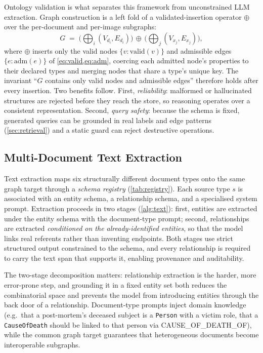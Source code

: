 \documentclass[conference]{IEEEtran}
\newcommand{\rel}[1]{\textup{\MakeUppercase{#1}}}
\newcommand{\node}[1]{\texttt{#1}}
\begin{document}
Ontology validation is what separates this framework from unconstrained LLM
extraction. Graph construction is a left fold of a validated-insertion operator
$\oplus$ over the per-document and per-image subgraphs:
\begin{equation}
G \;=\; \Big(\bigoplus_i (V_{d_i},E_{d_i})\Big) \,\oplus\, \Big(\bigoplus_j (V_{x_j},E_{x_j})\Big),
\label{eq:construct}
\end{equation}
where $\oplus$ inserts only the valid nodes $\{v:\mathrm{valid}(v)\}$ and
admissible edges $\{e:\mathrm{adm}(e)\}$ of \cref{eq:valid,eq:adm}, coercing each
admitted node's properties to their declared types and merging nodes that share a
type's unique key. The invariant ``$G$ contains only valid nodes and admissible
edges'' therefore holds after every insertion. Two benefits follow. First,
\emph{reliability}: malformed or hallucinated structures are rejected before they
reach the store, so reasoning operates over a consistent representation. Second,
\emph{query safety}: because the schema is fixed, generated queries can be
grounded in real labels and edge patterns (\cref{sec:retrieval}) and a static
guard can reject destructive operations.

\subsection{Multi-Document Text Extraction}
\label{sec:text}

Text extraction maps six structurally different document types onto the same
graph target through a \emph{schema registry} (\cref{tab:registry}). Each source
type $s$ is associated with an entity schema, a relationship schema, and a
specialised system prompt.
Extraction proceeds in two stages
(\cref{alg:text}): first, entities are extracted under the entity schema with the
document-type prompt; second, relationships are extracted \emph{conditioned on
the already-identified entities}, so that the model links real referents rather
than inventing endpoints. Both stages use strict structured output constrained to
the schema, and every relationship is required to carry the text span that
supports it, enabling provenance and auditability.

The two-stage decomposition matters: relationship extraction is the harder,
more error-prone step, and grounding it in a fixed entity set both reduces the
combinatorial space and prevents the model from introducing entities through the
back door of a relationship. Document-type prompts inject domain knowledge
(e.g.\ that a post-mortem's deceased subject is a \node{Person} with a victim
role, that a \node{CauseOfDeath} should be linked to that person via
\rel{cause\_of\_death\_of}), while the common graph target guarantees that
heterogeneous documents become interoperable subgraphs.
\end{document}
